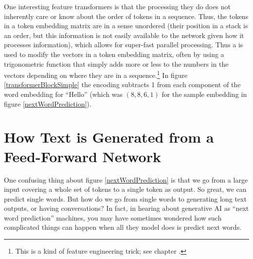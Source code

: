 One interesting feature transformers is that the processing they do does not inherently care or know about the order of tokens in a sequence. Thus, the tokens in a token embedding matrix are in a sense unordered (their position in a stack is an order, but this information is not easily available to the network given how it processes information), which allows for super-fast parallel processing. Thus a  is used to modify the vectors in a token embedding matrix, often by using a trigonometric function that simply adds more or less to the numbers in the vectors depending on where they are in a sequence.\footnote{This is a kind of feature engineering trick; see chapter .}  In figure \ref{transformerBlockSimple} the encoding subtracts 1 from each component of the word embedding for ``Hello'' (which was $(8,8,6,1)$ for the sample embedding in figure \ref{nextWordPrediction}).
  
\section{How Text is Generated from a Feed-Forward Network}


One confusing thing about figure \ref{nextWordPrediction} is that we go from a large input covering a whole set of tokens to a single token as output. So great, we can predict single words. But how do we go from single words to generating long text outputs, or having conversations? In fact, in hearing about generative AI as ``next word prediction'' machines, you may have sometimes wondered how such complicated things can happen when all they model does is predict next words.

